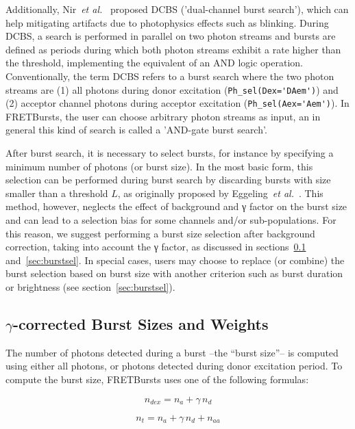 Additionally, Nir~\textit{et al.}~\cite{Nir_2006} proposed DCBS ('dual-channel burst search'), which can help mitigating artifacts due to photophysics effects such as blinking.
During DCBS, a search is performed in parallel on two photon streams
and bursts are defined as periods during which both photon streams exhibit a rate higher than
the threshold, implementing the equivalent of an AND logic operation.
Conventionally, the term DCBS refers to a burst search where the two photon streams
are (1) all photons during donor excitation (\verb|Ph_sel(Dex='DAem')|) and
(2) acceptor channel photons during acceptor excitation (\verb|Ph_sel(Aex='Aem')|).
In FRETBursts, the user can choose arbitrary photon streams as input, an in general
this kind of search is called a 'AND-gate burst search'.

After burst search, it is necessary to select
bursts, for instance by specifying a minimum number of photons (or burst size). In the most
basic form, this selection can be performed during burst search by discarding
bursts with size smaller than a threshold $L$, as originally proposed by
Eggeling~\textit{et al.}~\cite{Eggeling_1998}.
This method, however, neglects the effect
of background and γ factor on the burst size and can lead to a selection
bias for some channels and/or sub-populations.
For this reason, we suggest performing a burst size selection after background
correction, taking into account the γ factor, as discussed in
sections~\ref{sec:burstsizeweights} and~\ref{sec:burstsel}.
In special cases, users may choose to replace (or combine)
the burst selection based on burst size
with another criterion such as burst duration or brightness (see section~\ref{sec:burstsel}).

\subsection{$\gamma$-corrected Burst Sizes and Weights}
\label{sec:burstsizeweights}

The number of photons detected during a burst --the ``burst size''--
is computed using either all photons, or photons detected
during donor excitation period. To compute the burst size, FRETBursts uses
one of the following formulas:

\begin{equation}
\label{eq:burstsize_dex}
n_{dex} = n_a + \gamma\,n_d
\end{equation}

\begin{equation}
\label{eq:burstsize_allph}
n_t = n_a + \gamma\,n_d + n_{aa}
\end{equation}

